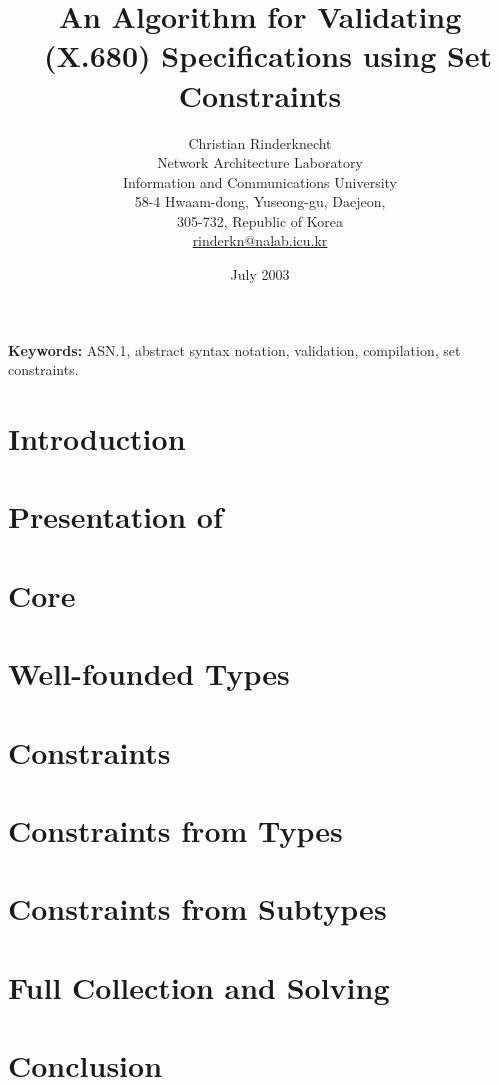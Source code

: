 \documentclass[11pt,a4paper]{article}
\title{An Algorithm for Validating \ASN~(\mbox{X.680}) Specifications
       using Set Constraints}
\author{Christian Rinderknecht\\
Network Architecture Laboratory \\
Information and Communications University \\
58-4 Hwaam-dong, Yuseong-gu, Daejeon, \\
305-732, Republic of Korea\\
{\small\url{rinderkn@nalab.icu.kr}}}
\date{July 2003}
\begin{document}
\maketitle



\noindent\textbf{Keywords:} \mbox{ASN.1}, abstract syntax notation,
validation, compilation, set constraints.

\section*{Introduction}
\label{introduction}


\section{Presentation of \ASN}
\label{presentation}


\section{Core \ASN}
\label{core}


\section{Well-founded Types}
\label{well_founded_types}


\section{Constraints}
\label{constraints}


\section{Constraints from Types}
\label{constraints_from_types}


\section{Constraints from Subtypes}
\label{constraints_from_subtypes}


\section{Full Collection and Solving}
\label{full_collection_and_solving}


\section*{Conclusion}




\end{document}
